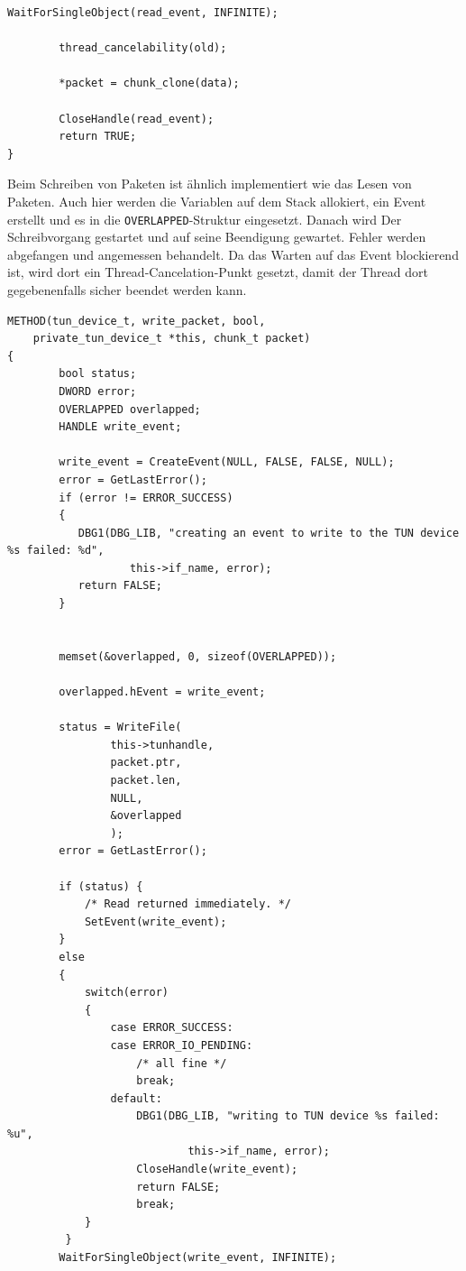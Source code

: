 {\begin{lstlisting}[caption=Code für read\_packet,label=lst:read_packet]
        WaitForSingleObject(read_event, INFINITE);

        thread_cancelability(old);

        *packet = chunk_clone(data);

        CloseHandle(read_event);
        return TRUE;
}
\end{lstlisting}

Beim Schreiben von Paketen ist ähnlich implementiert wie das Lesen von Paketen.
Auch hier werden die Variablen auf dem Stack allokiert, ein Event erstellt
und es in die \texttt{OVERLAPPED}-Struktur eingesetzt.
Danach wird Der Schreibvorgang gestartet und auf seine Beendigung gewartet.
Fehler werden abgefangen und angemessen behandelt. Da das Warten auf das Event
blockierend ist, wird dort ein Thread-Cancelation-Punkt gesetzt, damit der Thread dort
gegebenenfalls sicher beendet werden kann.

\begin{lstlisting}[caption=Code für write\_packet,label=lst:write_packet]
METHOD(tun_device_t, write_packet, bool,
	private_tun_device_t *this, chunk_t packet)
{
        bool status;
        DWORD error;
        OVERLAPPED overlapped;
        HANDLE write_event;

        write_event = CreateEvent(NULL, FALSE, FALSE, NULL);
        error = GetLastError();
        if (error != ERROR_SUCCESS)
        {
           DBG1(DBG_LIB, "creating an event to write to the TUN device %s failed: %d",
                   this->if_name, error);
           return FALSE;
        }


        memset(&overlapped, 0, sizeof(OVERLAPPED));

        overlapped.hEvent = write_event;

        status = WriteFile(
                this->tunhandle,
                packet.ptr,
                packet.len,
                NULL,
                &overlapped
                );
        error = GetLastError();

        if (status) {
            /* Read returned immediately. */
            SetEvent(write_event);
        }
        else
        {
            switch(error)
            {
                case ERROR_SUCCESS:
                case ERROR_IO_PENDING:
                    /* all fine */
                    break;
                default:
                    DBG1(DBG_LIB, "writing to TUN device %s failed: %u",
                            this->if_name, error);
                    CloseHandle(write_event);
                    return FALSE;
                    break;
            }
         }
        WaitForSingleObject(write_event, INFINITE);


\end{lstlisting}}
